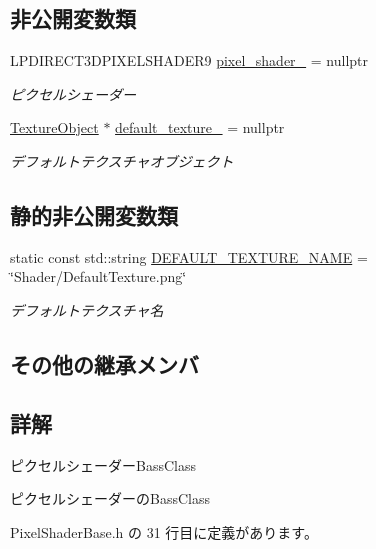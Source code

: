 \subsection*{非公開変数類}
\begin{DoxyCompactItemize}
\item 
L\+P\+D\+I\+R\+E\+C\+T3\+D\+P\+I\+X\+E\+L\+S\+H\+A\+D\+E\+R9 \mbox{\hyperlink{class_pixel_shader_base_a5d7213c21268dc57ef82d37a64ff942f}{pixel\+\_\+shader\+\_\+}} = nullptr
\begin{DoxyCompactList}\small\item\em ピクセルシェーダー \end{DoxyCompactList}\item 
\mbox{\hyperlink{class_texture_object}{Texture\+Object}} $\ast$ \mbox{\hyperlink{class_pixel_shader_base_a9bd118473860effedf5ab1201352540f}{default\+\_\+texture\+\_\+}} = nullptr
\begin{DoxyCompactList}\small\item\em デフォルトテクスチャオブジェクト \end{DoxyCompactList}\end{DoxyCompactItemize}
\subsection*{静的非公開変数類}
\begin{DoxyCompactItemize}
\item 
static const std\+::string \mbox{\hyperlink{class_pixel_shader_base_a34ef5095d790635c1a0d71d5d8a5863c}{D\+E\+F\+A\+U\+L\+T\+\_\+\+T\+E\+X\+T\+U\+R\+E\+\_\+\+N\+A\+ME}} = \char`\"{}Shader/Default\+Texture.\+png\char`\"{}
\begin{DoxyCompactList}\small\item\em デフォルトテクスチャ名 \end{DoxyCompactList}\end{DoxyCompactItemize}
\subsection*{その他の継承メンバ}


\subsection{詳解}
ピクセルシェーダー\+Bass\+Class 

ピクセルシェーダーの\+Bass\+Class 

 Pixel\+Shader\+Base.\+h の 31 行目に定義があります。



